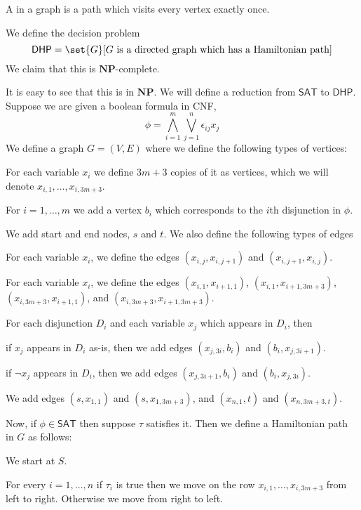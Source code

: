\documentclass[10pt]{article}
\def\sat{\mathsf{SAT}}
\def\NP{\mathbf{NP}}
\begin{document}
\begin{defn*}

    A  in a graph is a path which visits every vertex exactly once.

\end{defn*}

\def\dhp{\mathsf{DHP}}
\begin{exam*}

    We define the decision problem
    \[ \dhp = \set{G}[\text{$G$ is a directed graph which has a Hamiltonian path}] \]
    We claim that this is $\NP$-complete.

    It is easy to see that this is in $\NP$.
    We will define a reduction from $\sat$ to $\dhp$.
    Suppose we are given a boolean formula in CNF,
    \[ \phi = \bigwedge_{i=1}^m\bigvee_{j=1}^n\epsilon_{ij}x_j \]
    We define a graph $G=(V,E)$ where we define the following types of vertices:
    \benum
        \item For each variable $x_i$ we define $3m+3$ copies of it as vertices, which we will denote $x_{i,1},\dots,x_{i,3m+3}$.
        \item For $i=1,\dots,m$ we add a vertex $b_i$ which corresponds to the $i$th disjunction in $\phi$.
        \item We add start and end nodes, $s$ and $t$.
    \eenum
    We also define the following types of edges
    \benum
        \item For each variable $x_i$, we define the edges $(x_{i,j},x_{i,j+1})$ and $(x_{i,j+1},x_{i,j})$.
        \item For each variable $x_i$, we define the edges $(x_{i,1},x_{i+1,1})$, $(x_{i,1},x_{i+1,3m+3})$, $(x_{i,3m+3},x_{i+1,1})$, and $(x_{i,3m+3},x_{i+1,3m+3})$.
        \item For each disjunction $D_i$ and each variable $x_j$ which appears in $D_i$, then
        \benum
            \item if $x_j$ appears in $D_i$ as-is, then we add edges $(x_{j,3i},b_i)$ and $(b_i,x_{j,3i+1})$.
            \item if $\neg x_j$ appears in $D_i$, then we add edges $(x_{j,3i+1},b_i)$ and $(b_i,x_{j,3i})$.
        \eenum
        \item We add edges $(s,x_{1,1})$ and $(s,x_{1,3m+3})$, and $(x_{n,1},t)$ and $(x_{n,3m+3,t})$.
    \eenum

    Now, if $\phi\in\sat$ then suppose $\tau$ satisfies it.
    Then we define a Hamiltonian path in $G$ as follows:
    \benum
        \item We start at $S$.
        \item For every $i=1,\dots,n$ if $\tau_i$ is true then we move on the row $x_{i,1},\dots,x_{i,3m+3}$ from left to right.
        Otherwise we move from right to left.


\end{exam*}
\end{document}
